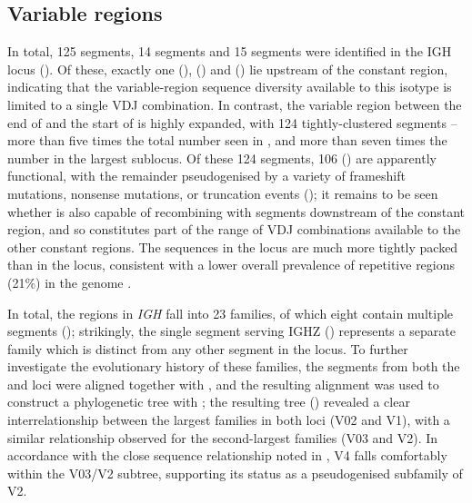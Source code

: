 	
\subsection{Variable regions}
\label{sec:xma-locus-variable}

In total, 125 \vh segments, 14 \dh segments and 15 \jh segments were identified in the \Xma IGH locus (). Of these, exactly one \vh (), \dh () and \jh () lie upstream of the  constant region, indicating that the variable-region sequence diversity available to this isotype is limited to a single VDJ combination. In contrast, the variable region between the end of  and the start of  is highly expanded, with 124 tightly-clustered \vh segments -- more than five times the total number seen in \Nfu, and more than seven times the number in the largest \Nfu sublocus. Of these 124 \vh segments, 106 () are apparently functional, with the remainder pseudogenised by a variety of frameshift mutations, nonsense mutations, or truncation events (); it remains to be seen whether  is also capable of recombining with \dh segments downstream of the  constant region, and so constitutes part of the range of VDJ combinations available to the other constant regions. The \vh sequences in the \Xma locus are much more tightly packed than in the \Nfu locus, consistent with a lower overall prevalence of repetitive regions (21\%) in the \Xma genome \parencite{yuan2018repeats}.
	
In total, the \vh regions in \Xma \textit{IGH} fall into 23 families, of which eight contain multiple segments (); strikingly, the single \vh segment serving IGHZ () represents a separate family which is distinct from any other segment in the locus. To further investigate the evolutionary history of these families, the \vh segments from both the \Xma and \Nfu \igh{} loci were aligned together with , and the resulting alignment was used to construct a phylogenetic tree with  \parencite{stamatakis2014raxml8,stamatakis2005raxml3,stamatakis2006raxml6}; the resulting tree () revealed a clear interrelationship between the largest families in both loci (\Xma V02 and \Nfu V1), with a similar relationship observed for the second-largest families (\Xma V03 and \Nfu V2). 
In accordance with the close sequence relationship noted in , \Nfu V4 falls comfortably within the V03/V2 subtree, supporting its status as a pseudogenised subfamily of \Nfu V2.
		
